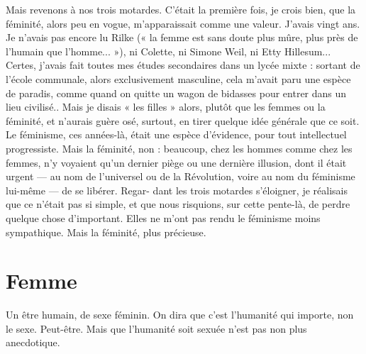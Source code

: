 Mais revenons à nos trois motardes. C’était la première fois, je crois bien,
que la féminité, alors peu en vogue, m’apparaissait comme une valeur. J'avais
vingt ans. Je n'avais pas encore lu Rilke (« la femme est sans doute plus mûre,
plus près de l’humain que l’homme... »), ni Colette, ni Simone Weil, ni Etty
Hillesum... Certes, j'avais fait toutes mes études secondaires dans un lycée
mixte : sortant de l’école communale, alors exclusivement masculine, cela
m'avait paru une espèce de paradis, comme quand on quitte un wagon de
bidasses pour entrer dans un lieu civilisé.. Mais je disais « les filles » alors,
plutôt que les femmes ou la féminité, et n’aurais guère osé, surtout, en tirer
quelque idée générale que ce soit. Le féminisme, ces années-là, était une espèce
d’évidence, pour tout intellectuel progressiste. Mais la féminité, non : beaucoup,
chez les hommes comme chez les femmes, n’y voyaient qu’un dernier
piège ou une dernière illusion, dont il était urgent — au nom de l’universel ou
de la Révolution, voire au nom du féminisme lui-même — de se libérer. Regar-
dant les trois motardes s'éloigner, je réalisais que ce n’était pas si simple, et que
nous risquions, sur cette pente-là, de perdre quelque chose d’important. Elles
ne m'ont pas rendu le féminisme moins sympathique. Mais la féminité, plus
précieuse.

\section{Femme}
Un être humain, de sexe féminin. On dira que c’est l’humanité qui
importe, non le sexe. Peut-être. Mais que l’humanité soit sexuée
n’est pas non plus anecdotique.

